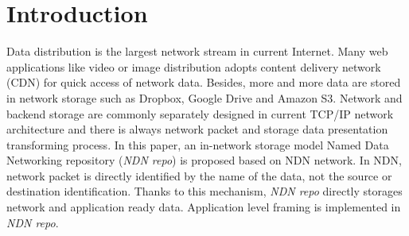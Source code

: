 \documentclass[conference]{IEEEtran}
\begin{document}




\maketitle


\begin{abstract}

\end{abstract}





%
\IEEEpeerreviewmaketitle

\section{Introduction}

Data distribution is the largest network stream in current Internet. Many web applications like video or image distribution adopts content delivery network (CDN) for quick access of network data. Besides, more and more data are stored in network storage such as Dropbox, Google Drive and Amazon S3. Network and backend storage are commonly separately designed in current TCP/IP network architecture and there is always network packet and storage data presentation transforming process. In this paper, an in-network storage model Named Data Networking repository (\emph{NDN repo}) is proposed based on NDN network. In NDN, network packet is directly identified by the name of the data, not the source or destination identification. Thanks to this mechanism, \emph{NDN repo} directly storages network and application ready data. Application level framing is implemented in \emph{NDN repo}.
\end{document}
